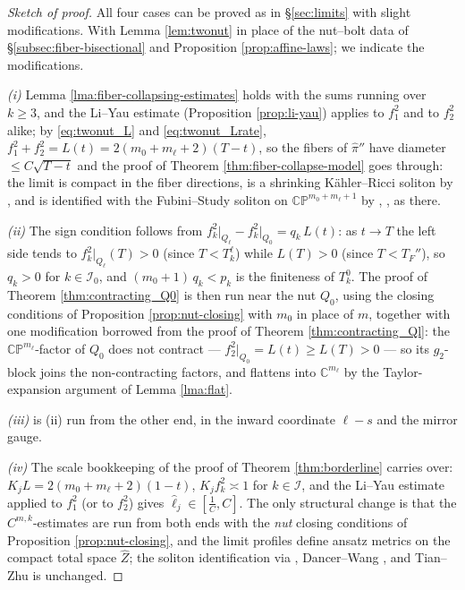 \documentclass[11pt]{amsart}
\theoremstyle{plain}
\numberwithin{equation}{section}
\theoremstyle{definition}
\theoremstyle{remark}
\begin{document}
\begin{proof}[Sketch of proof]
All four cases can be proved as in \S\ref{sec:limits} with slight modifications. With Lemma \ref{lem:twonut} in place of the nut--bolt data of \S\ref{subsec:fiber-bisectional} and Proposition \ref{prop:affine-laws}; we indicate the modifications.

\emph{(i)} Lemma \ref{lma:fiber-collapsing-estimates} holds with the sums running over $k \geq 3$, and the Li--Yau estimate (Proposition \ref{prop:li-yau}) applies to $f_1^2$ and to $f_2^2$ alike; by \eqref{eq:twonut_L} and \eqref{eq:twonut_Lrate}, $f_1^2 + f_2^2 = L (t) = 2 ( m_0 + m_\ell + 2 ) ( T - t )$, so the fibers of $\widehat{\pi}''$ have diameter $\leq C \sqrt{T - t}$ and the proof of Theorem \ref{thm:fiber-collapse-model} goes through: the limit is compact in the fiber directions, is a shrinking K\"ahler--Ricci soliton by \cite{EMT, Naber}, and is identified with the Fubini--Study soliton on $\mathbb{CP}^{m_0 + m_\ell + 1}$ by \cite{BM}, \cite{TZhu}, as there.

\emph{(ii)} The sign condition follows from $f_k^2 \big|_{Q_\ell} - f_k^2 \big|_{Q_0} = q_k\, L (t)$: as $t \to T$ the left side tends to $f_k^2 \big|_{Q_\ell} (T) > 0$ (since $T < T_k^\ell$) while $L (T) > 0$ (since $T < T_F''$), so $q_k > 0$ for $k \in \mathcal{I}_0$, and $( m_0 + 1 )\, q_k < p_k$ is the finiteness of $T_k^0$. The proof of Theorem \ref{thm:contracting_Q0} is then run near the nut $Q_0$, using the closing conditions of Proposition \ref{prop:nut-closing} with $m_0$ in place of $m$, together with one modification borrowed from the proof of Theorem \ref{thm:contracting_Ql}: the $\mathbb{CP}^{m_\ell}$-factor of $Q_0$ does not contract --- $f_2^2 \big|_{Q_0} = L (t) \geq L (T) > 0$ --- so its $g_2$-block joins the non-contracting factors, and flattens into $\mathbb{C}^{m_\ell}$ by the Taylor-expansion argument of Lemma \ref{lma:flat}.

\emph{(iii)} is (ii) run from the other end, in the inward coordinate $\ell - s$ and the mirror gauge.

\emph{(iv)} The scale bookkeeping of the proof of Theorem \ref{thm:borderline} carries over: $K_j L = 2 ( m_0 + m_\ell + 2 ) ( 1 - t )$, $K_j f_k^2 \asymp 1$ for $k \in \mathcal{I}$, and the Li--Yau estimate applied to $f_1^2$ (or to $f_2^2$) gives $\hat\ell_j \in [ \frac{1}{C}, C ]$. The only structural change is that the $C^{m,k}$-estimates are run from both ends with the \emph{nut} closing conditions of Proposition \ref{prop:nut-closing}, and the limit profiles define ansatz metrics on the compact total space $\widehat{Z}$; the soliton identification via \cite{EMT, Naber}, Dancer--Wang \cite{DW2011}, and Tian--Zhu \cite{TZhu} is unchanged.
\end{proof}
\end{document}
